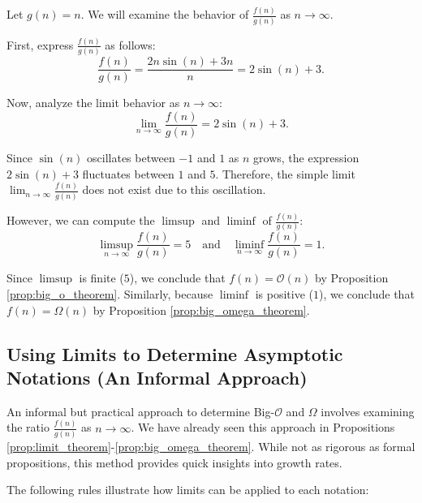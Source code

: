                 \begin{solution}
                Let \( g(n) = n \). We will examine the behavior of \( \frac{f(n)}{g(n)} \) as \( n \to \infty \).
                
                First, express \( \frac{f(n)}{g(n)} \) as follows:
                \[
                \frac{f(n)}{g(n)} = \frac{2n \sin(n) + 3n}{n} = 2 \sin(n) + 3.
                \]
                
                Now, analyze the limit behavior as \( n \to \infty \):
                \[
                \lim_{n \to \infty} \frac{f(n)}{g(n)} = 2 \sin(n) + 3.
                \]
                
                Since \( \sin(n) \) oscillates between \( -1 \) and \( 1 \) as \( n \) grows, the expression \( 2 \sin(n) + 3 \) fluctuates between \( 1 \) and \( 5 \). Therefore, the simple limit \( \lim_{n \to \infty} \frac{f(n)}{g(n)} \) does not exist due to this oscillation.
                
                However, we can compute the \(\limsup\) and \(\liminf\) of \( \frac{f(n)}{g(n)} \):
                \[
                \limsup_{n \to \infty} \frac{f(n)}{g(n)} = 5 \quad \text{and} \quad \liminf_{n \to \infty} \frac{f(n)}{g(n)} = 1.
                \]
                
                Since \(\limsup\) is finite (\(5\)), we conclude that \( f(n) = \mathcal{O}(n) \) by Proposition \ref{prop:big_o_theorem}. Similarly, because \(\liminf\) is positive (\(1\)), we conclude that \( f(n) = \Omega(n) \) by Proposition \ref{prop:big_omega_theorem}.
                \end{solution}
                
                
                

        \subsection*{Using Limits to Determine Asymptotic Notations (An Informal Approach)}

        An informal but practical approach to determine Big-$\mathcal{O}$ and $\Omega$ involves examining the ratio \( \frac{f(n)}{g(n)} \) as \( n \to \infty \). We have already seen this approach in Propositions \ref{prop:limit_theorem}-\ref{prop:big_omega_theorem}. While not as rigorous as formal propositions, this method provides quick insights into growth rates.
        
        The following rules illustrate how limits can be applied to each notation:
       

